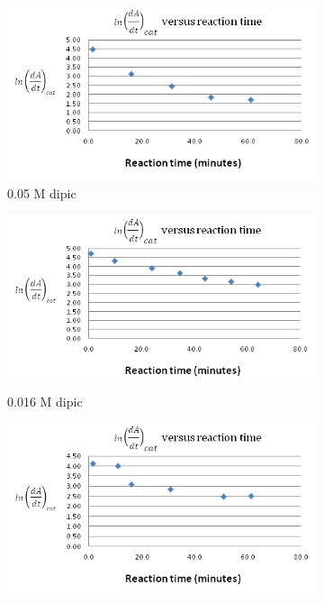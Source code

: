 \begin{figure}[h]
\begin{subfigure}{0.5\textwidth}
                \label{fig:0.10M_dipic_readings}
        \end{subfigure}
        \begin{subfigure}{0.5\textwidth}
                \includegraphics[width=\textwidth]{./Figures/05M_dipic_readings.png}
                \caption{0.05 M dipic}
                \label{fig:0.05M_dipic_readings}
        \end{subfigure}\begin{subfigure}{0.5\textwidth}
                \includegraphics[width=\textwidth]{./Figures/016M_dipic_readings.png}
                \caption{0.016 M dipic}
                \label{fig:0.016M_dipic_readings}
        \end{subfigure}
        \begin{subfigure}{0.5\textwidth}
                \includegraphics[width=\textwidth]{./Figures/032M_dipic_readings.png}

\end{subfigure}
\end{figure}
